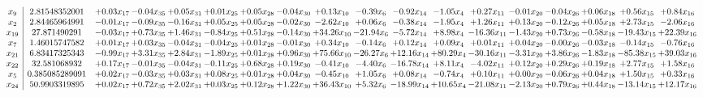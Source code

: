 \documentclass[9pt]{article}
\begin{document}
 \[\begin{array}{c| c c@{\hskip 2pt} c@{\hskip 2pt} c@{\hskip 2pt} c@{\hskip 2pt} c@{\hskip 2pt} c@{\hskip 2pt} c@{\hskip 2pt} c@{\hskip 2pt} c@{\hskip 2pt} c@{\hskip 2pt} c@{\hskip 2pt} c@{\hskip 2pt} c@{\hskip 2pt} c@{\hskip 2pt} c@{\hskip 2pt} c@{\hskip 2pt} }
 x_{9}   &  2.81548352001 & +  0.03 x_{17} & -0.04 x_{35} & +  0.05 x_{31} & +  0.01 x_{25} & +  0.05 x_{28} & -0.04 x_{30} & +  0.13 x_{10} & -0.39 x_{6} & -0.92 x_{14} & -1.05 x_{4} & +  0.27 x_{11} & -0.01 x_{20} & -0.04 x_{26} & +  0.06 x_{18} & +  0.56 x_{15} & +  0.84 x_{16}\\
 x_{2}   &  2.84465964991 & -0.01 x_{17} & -0.09 x_{35} & -0.16 x_{31} & +  0.05 x_{25} & +  0.05 x_{28} & -0.02 x_{30} & -2.62 x_{10} & +  0.06 x_{6} & -0.38 x_{14} & -1.95 x_{4} & +  1.26 x_{11} & +  0.13 x_{20} & -0.12 x_{26} & +  0.05 x_{18} & +  2.73 x_{15} & -2.06 x_{16}\\
 x_{19}   &  27.871490291 & -0.03 x_{17} & +  0.73 x_{35} & +  1.46 x_{31} & -0.84 x_{25} & +  0.51 x_{28} & -0.14 x_{30} & + 34.26 x_{10} & -21.94 x_{6} & -5.72 x_{14} & +  8.98 x_{4} & -16.36 x_{11} & -1.43 x_{20} & +  0.73 x_{26} & -0.58 x_{18} & -19.43 x_{15} & + 22.39 x_{16}\\
 x_{7}   &  1.46015747582 & +  0.01 x_{17} & +  0.03 x_{35} & -0.04 x_{31} & -0.04 x_{25} & +  0.01 x_{28} & -0.01 x_{30} & +  0.34 x_{10} & -0.14 x_{6} & +  0.12 x_{14} & +  0.09 x_{4} & +  0.01 x_{11} & +  0.04 x_{20} & -0.00 x_{26} & -0.03 x_{18} & -0.14 x_{15} & -0.76 x_{16}\\
 x_{21}   &  6.83417325343 & -0.99 x_{17} & +  3.31 x_{35} & +  2.84 x_{31} & -1.89 x_{25} & +  0.01 x_{28} & +  0.96 x_{30} & + 75.66 x_{10} & -26.27 x_{6} & + 12.16 x_{14} & + 80.29 x_{4} & -30.16 x_{11} & -3.31 x_{20} & +  3.86 x_{26} & -1.83 x_{18} & -85.38 x_{15} & + 39.03 x_{16}\\
 x_{22}   &  32.581068932 & +  0.17 x_{17} & -0.01 x_{35} & -0.04 x_{31} & -0.11 x_{25} & +  0.68 x_{28} & +  0.19 x_{30} & -0.41 x_{10} & -4.40 x_{6} & -16.78 x_{14} & +  8.11 x_{4} & -4.02 x_{11} & +  0.12 x_{20} & +  0.29 x_{26} & +  0.19 x_{18} & +  2.77 x_{15} & +  1.58 x_{16}\\
 x_{5}   &  0.385085289091 & +  0.02 x_{17} & -0.03 x_{35} & +  0.03 x_{31} & +  0.08 x_{25} & +  0.01 x_{28} & +  0.04 x_{30} & -0.45 x_{10} & +  1.05 x_{6} & +  0.08 x_{14} & -0.74 x_{4} & +  0.10 x_{11} & +  0.00 x_{20} & -0.06 x_{26} & +  0.04 x_{18} & +  1.50 x_{15} & +  0.33 x_{16}\\
 x_{24}   &  50.9903319895 & +  0.02 x_{17} & +  0.72 x_{35} & +  2.02 x_{31} & +  0.03 x_{25} & +  0.12 x_{28} & +  1.22 x_{30} & + 36.43 x_{10} & +  5.32 x_{6} & -18.99 x_{14} & + 10.65 x_{4} & -21.08 x_{11} & -2.13 x_{20} & +  0.79 x_{26} & +  0.44 x_{18} & -13.14 x_{15} & + 12.17 x_{16}\\

\end{array}\]
\end{document}
